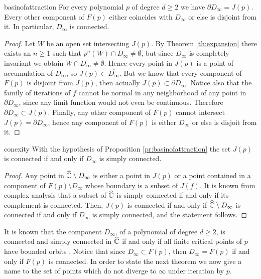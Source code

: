 \begin{myprop}{}{basinofattraction}
For every polynomial $p$ of degree $d\geq 2$ we have $\partial D_\infty =J(p)$. Every other component of $F(p)$ either coincides with $D_\infty$ or else is disjoint from it. In particular, $D_\infty$ is connected.
\end{myprop}

\begin{proof}
Let $W$ be an open set intersecting $J(p)$. By Theorem \ref{th:expansion} there exists an $n\geq 1$ such that $p^n(W) \cap D_\infty \neq \emptyset$, but since $D_\infty$ is completely invariant we obtain $W\cap D_\infty\neq \emptyset$. Hence every point in $J(p)$ is a point of accumulation of $D_\infty$, so $J(p) \subset \overline{D_\infty}$. But we know that every component of $F(p)$ is disjoint from $J(p)$, then actually $J(p) \subset \partial D_\infty$. Notice also that the family of iterations of $f$ cannot be normal in any neighborhood of any point in $\partial D_\infty$, since any limit function would not even be continuous. Therefore $\partial D_\infty \subset J(p)$. Finally, any other component of $F(p)$ cannot intersect $J(p) =\partial D_\infty$, hence any component of $F(p)$ is either $D_\infty$ or else is disjoit from it.
\end{proof}

\begin{mycoro}{}{conexity}
With the hypothesis of Proposition \ref{pr:basinofattraction} the set $J(p)$ is connected if and only if $D_\infty$ is simply connected.
\end{mycoro}

\begin{proof}
Any point in $\widehat{\mathbb{C}}\setminus D_\infty$ is either a point in $J(p)$ or a point contained in a component of $F(p)\setminus D_\infty$ whose boundary is a subset of $J(f)$. It is known from complex analysis that a subset of $\widehat{\mathbb{C}}$ is simply connected if and only if its complement is connected. Then, $J(p)$ is connected if and only if $\widehat{\mathbb{C}}\setminus D_\infty$ is connected if and only if $D_\infty$ is simply connected, and the statement follows.
\end{proof}

It is known that the component $D_\infty$, of a polynomial of degree $d\geq 2$, is connected and simply connected in $\widehat{\mathbb{C}}$ if and only if all finite critical points of $p$ have bounded orbits \cite[Theorem 9.5.1]{beardon}. Notice that since $D_\infty\subset F(p)$, then $D_\infty = F(p)$ if and only if $F(p)$ is connected. In order to state the next theorem we now give a name to the set of points which do not diverge to $\infty$ under iteration by $p$.


